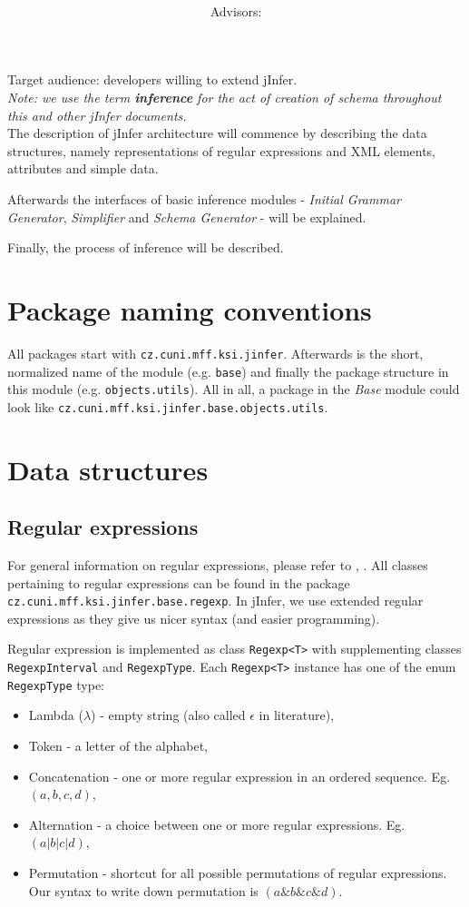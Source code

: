 \documentclass[a4paper,10pt,oneside]{article}
\title{\bf\mftitle}
\author{\mfauthor \\ Advisors: \mfadvisor}
\date{\mfplacedate}
\newcommand{\code}[1]{\texttt{#1}}
\newcommand{\jmodule}[1]{\emph{#1}}
\begin{document}
\maketitle
Target audience: developers willing to extend jInfer.\\

\emph{Note: we use the term \textbf{inference} for the act of creation of schema throughout this and other jInfer documents.}\\

The description of jInfer architecture will commence by describing the data
structures, namely representations of regular expressions and XML elements,
attributes and simple data.

Afterwards the interfaces of basic inference modules - \jmodule{Initial Grammar Generator}, \jmodule{Simplifier} and \jmodule{Schema Generator} - will be explained.

Finally, the process of inference will be described.

\section{Package naming conventions}
All packages start with \code{cz.cuni.mff.ksi.jinfer}. Afterwards is the short, normalized name of the module (e.g. \code{base}) and finally the package structure in this module (e.g. \texttt{objects.utils}). All in all, a package in the \jmodule{Base} module could look like \code{cz.cuni.mff.ksi.jinfer.base.objects.utils}.

\section{Data structures}
\subsection{Regular expressions}
For general information on regular expressions, please refer to \cite{wikiregexp}, \cite{automatatheory}.
All classes pertaining to regular expressions can be found in the package \code{cz.cuni.mff.ksi.jinfer.base.regexp}.
In jInfer, we use extended regular expressions as they give us nicer syntax (and easier programming).

Regular expression is implemented as class \code{Regexp<T>} with supplementing classes \code{RegexpInterval} and \code{RegexpType}.
Each \code{Regexp<T>} instance has one of the enum \code{RegexpType} type:
\begin{itemize}
	\item Lambda ($\lambda$) - empty string (also called $\epsilon$ in literature),
	\item Token - a letter of the alphabet,
	\item Concatenation - one or more regular expression in an ordered sequence. Eg. $(a, b, c, d)$,
	\item Alternation - a choice between one or more regular expressions. Eg. $(a | b | c | d)$,
	\item Permutation - shortcut for all possible permutations of regular expressions. Our syntax to write down permutation is $(a\& b\& c\& d)$.
\end{itemize}
\end{document}
